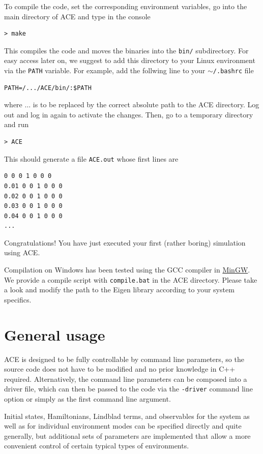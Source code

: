 \documentclass{scrartcl}
\begin{document}
To compile the code, set the corresponding environment variables, 
go into the main directory of ACE and type in the
console
\begin{verbatim}
> make 
\end{verbatim}
This compiles the code and moves the binaries into the \texttt{bin/}
subdirectory. For easy access later on, we suggest to add this directory
to your Linux environment via the \texttt{PATH} variable. For example, 
add the follwing line to your \texttt{$\sim$/.bashrc} file 
\begin{verbatim}
PATH=/.../ACE/bin/:$PATH 
\end{verbatim}
where $\dots$ is to be replaced by the correct absolute path to the ACE 
directory. Log out and log in again to activate the changes. 
Then, go to a temporary directory and run
\begin{verbatim}
> ACE
\end{verbatim}
This should generate a file \texttt{ACE.out} whose first lines are
\begin{verbatim}
0 0 0 1 0 0 0
0.01 0 0 1 0 0 0
0.02 0 0 1 0 0 0
0.03 0 0 1 0 0 0
0.04 0 0 1 0 0 0
...
\end{verbatim}
Congratulations! You have just executed your first (rather boring) simulation
using ACE.


Compilation on Windows has been tested using the GCC compiler in
\href{http://mingw-w64.org/doku.php}{MinGW}. We provide a compile script 
with \texttt{compile.bat} in the ACE directory. Please take a look and 
modify the path to the Eigen library according to your system specifics.

\section{General usage}
ACE is designed to be fully controllable by command line parameters, so
the source code does not have to be modified and 
no prior knowledge in C++ required.
Alternatively, the command line parameters can be composed into a driver file,
which can then be passed to the code via the \texttt{-driver} command line 
option or simply as the first command line argument.
%

Initial states, Hamiltonians, Lindblad terms, and observables for the system 
as well as for individual environment modes can be specified directly and
quite generally, 
but additional sets of parameters are implemented that allow a more convenient
control of certain typical types of environments.
\end{document}
